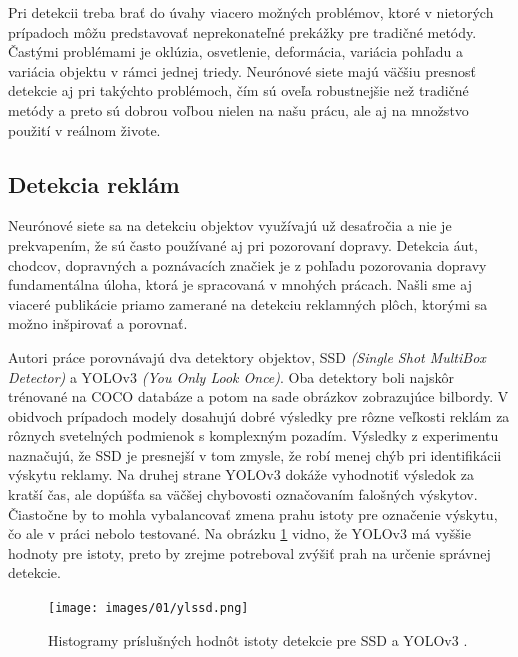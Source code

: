 Pri detekcii treba brať do úvahy viacero možných problémov, ktoré v nietorých prípadoch môžu predstavovať neprekonateľné prekážky pre tradičné metódy. Častými problémami je oklúzia, osvetlenie, deformácia, variácia pohľadu a variácia objektu v rámci jednej triedy. Neurónové siete majú väčšiu presnosť detekcie aj pri takýchto problémoch, čím sú oveľa robustnejšie než tradičné metódy a preto sú dobrou voľbou nielen na našu prácu, ale aj na množstvo použití v reálnom živote.

\subsection{Detekcia reklám}

Neurónové siete sa na detekciu objektov využívajú už desaťročia a nie je prekvapením, že sú často používané aj pri pozorovaní dopravy. Detekcia áut, chodcov, dopravných a poznávacích značiek je z pohľadu pozorovania dopravy fundamentálna úloha, ktorá je spracovaná v mnohých prácach. Našli sme aj viaceré publikácie priamo zamerané na detekciu reklamných plôch, ktorými sa možno inšpirovať a porovnať.

Autori práce \cite{SSD-YOLO} porovnávajú dva detektory objektov, SSD \textit{(Single Shot MultiBox Detector)} a YOLOv3 \textit{(You Only Look Once)}. Oba detektory boli najskôr trénované na COCO databáze \cite{Coco} a potom na sade obrázkov zobrazujúce bilbordy. V obidvoch prípadoch modely dosahujú dobré výsledky pre rôzne veľkosti reklám za rôznych svetelných podmienok s komplexným pozadím. Výsledky z experimentu naznačujú, že SSD je presnejší v tom zmysle, že robí menej chýb pri identifikácii výskytu reklamy. Na druhej strane YOLOv3 dokáže vyhodnotiť výsledok za kratší čas, ale dopúšťa sa väčšej chybovosti označovaním falošných výskytov. Čiastočne by to mohla vybalancovať zmena prahu istoty pre označenie výskytu, čo ale v práci nebolo testované. Na obrázku \ref{img:ssd-yolo} vidno, že YOLOv3 má vyššie hodnoty pre istoty, preto by zrejme potreboval zvýšiť prah na určenie správnej detekcie.

\begin{figure}[H]
    \centering
    \texttt{[image: images/01/ylssd.png]}
    \caption{Histogramy príslušných hodnôt istoty detekcie pre SSD a YOLOv3 \cite{SSD-YOLO}.}
    \label{img:ssd-yolo}
\end{figure}


